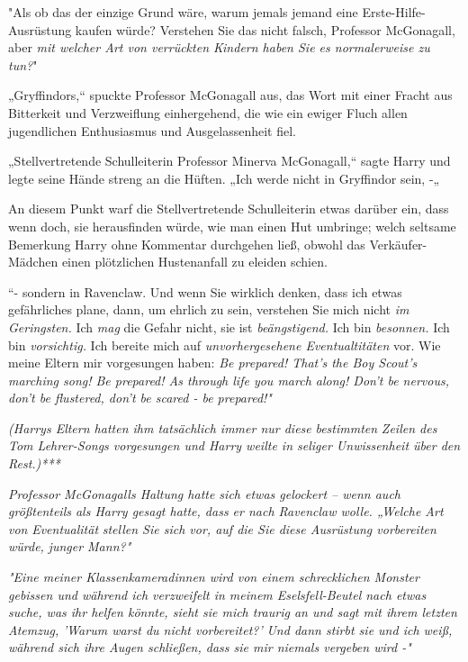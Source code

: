 {"Als ob das der einzige Grund wäre, warum jemals jemand eine Erste-Hilfe-Ausrüstung kaufen würde? Verstehen Sie das nicht falsch, Professor McGonagall, aber \emph{mit welcher Art von verrückten Kindern haben Sie es normalerweise zu tun?}"

„Gryffindors,“ spuckte Professor McGonagall aus, das Wort mit einer Fracht aus Bitterkeit und Verzweiflung einhergehend, die wie ein ewiger Fluch allen jugendlichen Enthusiasmus und Ausgelassenheit fiel.

„Stellvertretende Schulleiterin Professor Minerva McGonagall,“ sagte Harry und legte seine Hände streng an die Hüften. „Ich werde nicht in Gryffindor sein, -„

An diesem Punkt warf die Stellvertretende Schulleiterin etwas darüber ein, dass wenn doch, sie herausfinden würde, wie man einen Hut umbringe; welch seltsame Bemerkung Harry ohne Kommentar durchgehen ließ, obwohl das Verkäufer-Mädchen einen plötzlichen Hustenanfall zu eleiden schien.

“- sondern in Ravenclaw. Und wenn Sie wirklich denken, dass ich etwas gefährliches plane, dann, um ehrlich zu sein, verstehen Sie mich nicht \emph{im Geringsten.} Ich \emph{mag} die Gefahr nicht, sie ist \emph{beängstigend.} Ich bin \emph{besonnen.} Ich bin \emph{vorsichtig.} Ich bereite mich auf \emph{unvorhergesehene Eventualtitäten} vor. Wie meine Eltern mir vorgesungen haben: \emph{Be prepared! That's the Boy Scout's marching song! Be prepared! As through life you march along! Don't be nervous, don't be flustered, don't be scared - be prepared!"}

\emph{(Harrys Eltern hatten ihm tatsächlich immer nur diese} \emph{\emph{bestimmten}} \emph{Zeilen des Tom Lehrer-Songs vorgesungen und Harry weilte in seliger Unwissenheit über den Rest.)***}

\emph{Professor McGonagalls Haltung hatte sich etwas gelockert -- wenn auch größtenteils als Harry gesagt hatte, dass er nach Ravenclaw wolle. „Welche Art von} \emph{\emph{Eventualität}} \emph{stellen Sie sich vor, auf die Sie diese Ausrüstung vorbereiten würde,} \emph{\emph{junger Mann?}"}

\emph{"Eine meiner Klassenkameradinnen wird von einem schrecklichen Monster gebissen und während ich verzweifelt in meinem Eselsfell-Beutel nach etwas suche, was ihr helfen könnte, sieht sie mich traurig an und sagt mit ihrem letzten Atemzug,} \emph{\emph{'Warum warst du nicht vorbereitet?'}} \emph{Und dann stirbt sie und ich weiß, während sich ihre Augen schließen, dass sie mir niemals vergeben wird -"}

}
